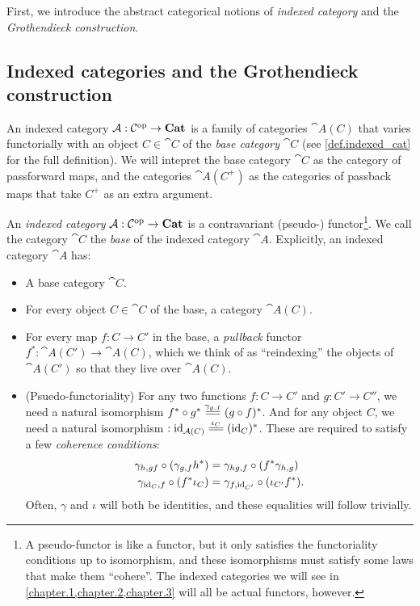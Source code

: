 \documentclass[DynamicalBook]{subfiles}
\begin{document}
First, we introduce the abstract categorical notions of \emph{indexed category}
and the \emph{Grothendieck construction}.




\subsection{Indexed categories and the Grothendieck construction}\label{sec.indexed_categories}

An indexed category $\mathcal{A} : \mathcal{C}^{\textnormal{op}} \to \textbf{Cat}$ is a family of
categories $\cat{A}(C)$ that varies functorially with an object $C \in \cat{C}$
of the \emph{base category} $\cat{C}$ (see \cref{def.indexed_cat} for the full
definition). We will intepret the base category $\cat{C}$ as the category of
passforward maps, and the categories $\cat{A}(C^+)$ as the categories of
passback maps that take $C^+$ as an extra argument.

\begin{definition}
  An \emph{indexed category} $\mathcal{A} : \mathcal{C}^{\textnormal{op}} \to \textbf{Cat}$ is a
  contravariant (pseudo-) functor\footnote{A pseudo-functor is like a functor,
    but it only satisfies the functoriality conditions up to isomorphism, and
    these isomorphisms must satisfy some laws that make them ``cohere''. The
    indexed categories we will see in \cref{chapter.1,chapter.2,chapter.3}
    will all be actual functors, however.}. We call the category $\cat{C}$ the
  \emph{base} of the indexed category $\cat{A}$. Explicitly, an indexed
  category $\cat{A}$ has:
  \begin{itemize}
  \item A base category $\cat{C}$.
  \item For every object $C \in \cat{C}$ of the base, a category $\cat{A}(C)$.
  \item For every map $f : C \to C'$ in the base, a \emph{pullback} functor
    $f^{\ast} : \cat{A}(C') \to \cat{A}(C)$, which we think of as ``reindexing''
    the objects of $\cat{A}(C')$ so that they live over $\cat{A}(C)$.
  \item (Psuedo-functoriality) For any two functions $f : C \to C'$ and $g : C' \to C''$, we need a
    natural isomorphism $f^{\ast} \circ g^{\ast} \xequals{\gamma_{g, f}} (g \circ
    f)^{\ast}$. And for any object $C$, we need a natural isomorphism $:
    \id_{\cat{A}(C)} \xequals{\iota_C } (\id_C)^{\ast}$. These are required to satisfy a
    few \emph{coherence conditions}:
\begin{align}
  \gamma_{h,gf} \circ (\gamma_{g, f}h^{\ast}) &= \gamma_{hg, f} \circ (f^{\ast}\gamma_{h, g}) \\
  \gamma_{\mathrm{id}_C, f} \circ (f^{\ast}\iota_C) &= \gamma_{f, \mathrm{id}_{C'}} \circ (\iota_{C'} f^{\ast}).
\end{align}
   Often, $\gamma$ and $\iota$ will both be identities, and these equalities
   will follow trivially.
  \end{itemize}
\end{definition}
\end{document}
